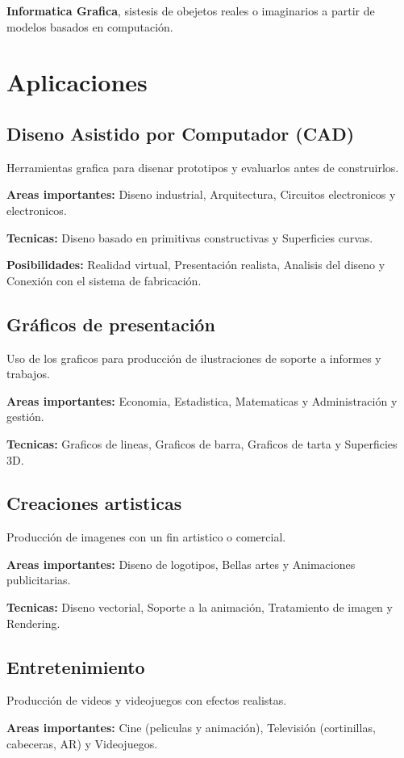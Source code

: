 \textbf{Informatica Grafica}, sistesis de obejetos reales o imaginarios a partir de modelos basados en computación.

\section{Aplicaciones}
\subsection{Diseno Asistido por Computador (CAD)}
Herramientas grafica para disenar prototipos y evaluarlos antes de construirlos.

\textbf{Areas importantes:} Diseno industrial, Arquitectura, Circuitos electronicos y electronicos.

\textbf{Tecnicas:} Diseno basado en primitivas constructivas y Superficies curvas.

\textbf{Posibilidades:} Realidad virtual, Presentación realista, Analisis del diseno y Conexión con el sistema de fabricación.

\subsection{Gráficos de presentación}
Uso de los graficos para producción de ilustraciones de soporte a informes y trabajos.

\textbf{Areas importantes:} Economia, Estadistica, Matematicas y Administración y gestión.

\textbf{Tecnicas:} Graficos de lineas, Graficos de barra, Graficos de tarta y Superficies 3D.

\subsection{Creaciones artisticas}
Producción de imagenes con un fin artistico o comercial.

\textbf{Areas importantes:} Diseno de logotipos, Bellas artes y Animaciones publicitarias.

\textbf{Tecnicas:} Diseno vectorial, Soporte a la animación, Tratamiento de imagen y Rendering.

\subsection{Entretenimiento}
Producción de videos y videojuegos con efectos realistas.

\textbf{Areas importantes:} Cine (peliculas y animación), Televisión (cortinillas, cabeceras, AR) y Videojuegos.

